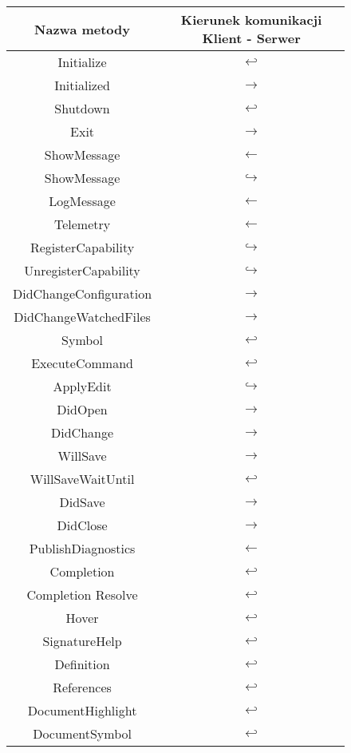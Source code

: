 \begin{figure}[H]
    \centering
\begin{tabular}{|c|c|}
\hline
Nazwa metody & Kierunek komunikacji Klient - Serwer\\
\hline
Initialize & $\hookleftarrow$ \\   
\hline
Initialized & $\rightarrow$ \\
\hline
Shutdown & $\hookleftarrow$ \\   
\hline
Exit & $\rightarrow$ \\
\hline
ShowMessage & $\leftarrow$ \\
\hline
ShowMessage & $\hookrightarrow$ \\
\hline
LogMessage & $\leftarrow$ \\
\hline
Telemetry & $\leftarrow$ \\
\hline
RegisterCapability & $\hookrightarrow$ \\
\hline
UnregisterCapability & $\hookrightarrow$ \\
\hline
DidChangeConfiguration & $\rightarrow$ \\
\hline
DidChangeWatchedFiles & $\rightarrow$ \\
\hline
Symbol & $\hookleftarrow$ \\
\hline
ExecuteCommand & $\hookleftarrow$ \\
\hline
ApplyEdit & $\hookrightarrow$ \\
\hline
DidOpen & $\rightarrow$ \\
\hline
DidChange & $\rightarrow$ \\
\hline
WillSave & $\rightarrow$ \\
\hline
WillSaveWaitUntil & $\hookleftarrow$ \\
\hline
DidSave & $\rightarrow$ \\
\hline
DidClose & $\rightarrow$ \\
\hline
PublishDiagnostics & $\leftarrow$ \\
\hline
Completion & $\hookleftarrow$ \\
\hline
Completion Resolve & $\hookleftarrow$ \\
\hline
Hover & $\hookleftarrow$ \\
\hline
SignatureHelp & $\hookleftarrow$ \\
\hline
Definition & $\hookleftarrow$ \\
\hline
References & $\hookleftarrow$ \\
\hline
DocumentHighlight & $\hookleftarrow$ \\
\hline
DocumentSymbol & $\hookleftarrow$ \\

\end{tabular}
\end{figure}
